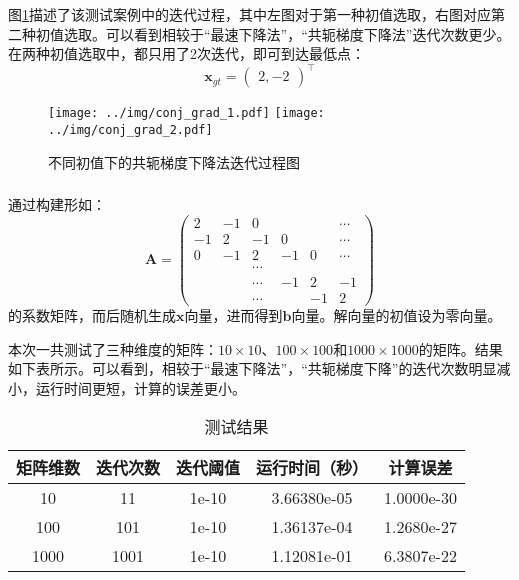\documentclass[12pt, onecolumn]{article}
\newcommand\normf{\fangsong}
\begin{document}
		图\ref{fig:共轭梯度下降法迭代过程图}描述了该测试案例中的迭代过程，其中左图对于第一种初值选取，右图对应第二种初值选取。可以看到相较于“最速下降法”，“共轭梯度下降法”迭代次数更少。在两种初值选取中，都只用了2次迭代，即可到达最低点：
		\begin{equation}
		\boldsymbol{x}_{gt}=\begin{pmatrix}
		2,-2
		\end{pmatrix}^\top
		\end{equation}
			\begin{figure}[h]
				\centering
				\texttt{[image: ../img/conj\_grad\_1.pdf]}
				\texttt{[image: ../img/conj\_grad\_2.pdf]}
				\caption{\normf 不同初值下的共轭梯度下降法迭代过程图}
				\label{fig:共轭梯度下降法迭代过程图}
			\end{figure}
	\subsubsection{\normf{大型稀疏矩阵测试}}
	通过构建形如：
		\begin{equation}
		\boldsymbol{A}=\begin{pmatrix}
		2&-1&0&&&\cdots\\
		-1&2&-1&0&&\cdots\\
		0&-1&2&-1&0&\cdots\\
		&&\cdots\\
		&&\cdots&-1&2&-1\\
		&&\cdots&&-1&2
		\end{pmatrix}
		\end{equation}
		的系数矩阵，而后随机生成$\boldsymbol{x}$向量，进而得到$\boldsymbol{b}$向量。解向量的初值设为零向量。
		
		本次一共测试了三种维度的矩阵：$10\times 10$、$100\times 100$和$1000\times 1000$的矩阵。结果如下表所示。可以看到，相较于“最速下降法”，“共轭梯度下降”的迭代次数明显减小，运行时间更短，计算的误差更小。
		\begin{table}[h]
		\normf
			\centering
			\caption{\normf 测试结果}
			\vspace{2mm}
		\begin{tabular}{c|cccc}
		\hline
		矩阵维数 & 迭代次数 & 迭代阈值  & 运行时间（秒）     & 计算误差       \\ \hline
		10   & 11   & 1e-10 & 3.66380e-05 & 1.0000e-30 \\
		100  & 101  & 1e-10 & 1.36137e-04 & 1.2680e-27 \\
		1000 & 1001 & 1e-10 & 1.12081e-01 & 6.3807e-22 \\ \hline
		\end{tabular}
		\end{table}
		
\end{document}
